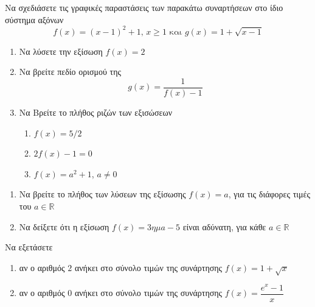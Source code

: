 \documentclass{presentation}
\begin{document}
\begin{askisi}
  Να σχεδιάσετε τις γραφικές παραστάσεις των παρακάτω συναρτήσεων στο ίδιο σύστημα αξόνων
  $$f(x)=(x-1)^2+1\text{, } x\ge 1 \text{ και } g(x)=1+\sqrt{x-1}$$
\end{askisi}

\begin{askisi}
  \href{https://www.geogebra.org/m/euy2uhma}{}
  \begin{enumerate}
    \item<1-> Να λύσετε την εξίσωση $f(x)=2$
    \item<2-> Να βρείτε πεδίο ορισμού της $$g(x)=\frac{1}{f(x)-1}$$
    \item<3-> Να Βρείτε το πλήθος ριζών των εξισώσεων
          \begin{enumerate}
            \item<4-> $f(x)=5/2$
            \item<5-> $2f(x)-1=0$
            \item<6-> $f(x)=a^2+1$, $a\ne 0$
          \end{enumerate}
  \end{enumerate}
\end{askisi}

\begin{askisi}
  \href{https://www.geogebra.org/m/dvzdm7bw}{}
  \begin{enumerate}
    \item<1-> Να βρείτε το πλήθος των λύσεων της εξίσωσης $f(x)=a$, για τις διάφορες τιμές του $a\in\mathbb{R}$
    \item<2-> Να δείξετε ότι η εξίσωση $f(x)=3ημ a - 5$ είναι αδύνατη, για κάθε $a\in\mathbb{R}$
  \end{enumerate}
\end{askisi}

\begin{askisi}
  Να εξετάσετε
  \begin{enumerate}
    \item<1-> αν ο αριθμός $2$ ανήκει στο σύνολο τιμών της συνάρτησης $f(x)=1+\sqrt{x}$
    \item<2-> αν ο αριθμός $0$ ανήκει στο σύνολο τιμών της συνάρτησης $f(x)=\dfrac{e^x-1}{x}$
  \end{enumerate}
\end{askisi}
\end{document}
